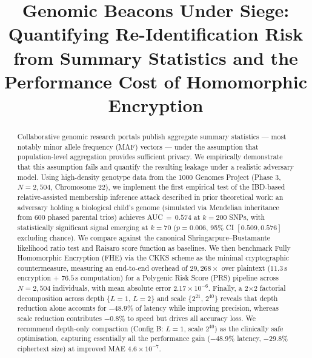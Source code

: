 \documentclass[conference]{IEEEtran}
\begin{document}
\title{Genomic Beacons Under Siege: Quantifying Re-Identification Risk
from Summary Statistics and the Performance Cost of Homomorphic Encryption}

\author{
}

\maketitle

\begin{abstract}
Collaborative genomic research portals publish aggregate summary statistics ---
most notably minor allele frequency (MAF) vectors --- under the assumption that
population-level aggregation provides sufficient privacy. We empirically
demonstrate that this assumption fails and quantify the resulting leakage under
a realistic adversary model. Using high-density genotype data from the 1000
Genomes Project (Phase 3, $N=2{,}504$, Chromosome 22), we implement the
first empirical test of the IBD-based relative-assisted membership inference
attack described in prior theoretical work: an adversary holding a biological
child's genome (simulated via Mendelian inheritance from 600 phased parental
trios) achieves AUC$\,=\,0.574$ at $k=200$ SNPs, with statistically
significant signal emerging at $k=70$ ($p=0.006$, 95\% CI $[0.509, 0.576]$
excluding chance). We compare against the canonical Shringarpure--Bustamante
likelihood ratio test and Raisaro score function as baselines. We then
benchmark Fully Homomorphic Encryption (FHE) via the CKKS scheme as the
minimal cryptographic countermeasure, measuring an end-to-end overhead of
$29{,}268\times$ over plaintext ($11.3\,\text{s}$ encryption $+$ $76.5\,\text{s}$
computation) for a Polygenic Risk Score (PRS) pipeline across $N=2{,}504$
individuals, with mean absolute error $2.17\times10^{-6}$. Finally, a 2$\times$2
factorial decomposition across depth $\{L=1,\,L=2\}$ and scale
$\{2^{21},\,2^{40}\}$ reveals that depth reduction alone accounts for $-48.9\%$
of latency while improving precision, whereas scale reduction contributes
$-0.8\%$ to speed but drives all accuracy loss. We recommend depth-only
compaction (Config B: $L=1$, scale $2^{40}$) as the clinically safe
optimisation, capturing essentially all the performance gain ($-48.9\%$
latency, $-29.8\%$ ciphertext size) at improved MAE $4.6\times10^{-7}$.
\end{abstract}
\end{document}
